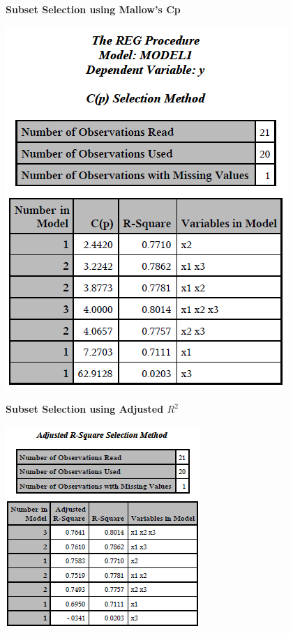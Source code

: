 \textbf{Subset Selection using Mallow's Cp}
\begin{flushleft}
\includegraphics[scale=0.55]{bodyfatmallows}
\end{flushleft}

\textbf{Subset Selection using Adjusted $R^2$}
\begin{flushleft}
\includegraphics[scale=1]{bodyfatadjr2}
\end{flushleft}

\newpage

